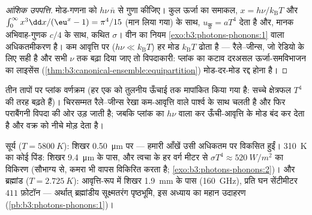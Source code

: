\begin{proof}[आंशिक उपपत्ति]
मोड-गणना को $h\nu\,\bar n$ से गुणा कीजिए। कुल ऊर्जा का
समाकल, $x = h\nu/k_{\text{B}}T$ और $\int_0^\infty
x^3\dd x/(\eu^x - 1) = \pi^4/15$ (मान लिया गया) के साथ, $u_{\text{कु}}
= aT^4$ देता है और, मानक अभिवाह-गुणक $c/4$ के साथ, कथित
$\sigma$। वीन का नियम \cref{exo:b3:photons-phonons:1} वाला
अधिकतमीकरण है। कम आवृत्ति पर ($h\nu \ll
k_{\text{B}}T$) हर मोड $k_{\text{B}}T$ ढोता है ---
रैले--जीन्स, जो रेडियो के लिए सही है और सभी
$\nu$ तक बढ़ा दिया जाए तो विपदाकारी: प्लांक का कटाव दरअसल
ऊर्जा-समविभाजन का लाइसेंस
(\cref{thm:b3:canonical-ensemble:equipartition}) मोड-दर-मोड रद्द
होना है।
\end{proof}

\begin{omfigure}

{\small तीन तापों पर प्लांक वर्णक्रम (हर एक को तुलनीय ऊँचाई तक
मापांकित किया गया है: सच्चे क्षेत्रफल $T^4$ की तरह बढ़ते हैं)।
चिरसम्मत रैले--जीन्स रेखा कम-आवृत्ति वाले पार्श्व के साथ चलती है और
फिर पराबैंगनी विपदा की ओर उड़ जाती है; जबकि प्लांक का $h\nu$ वाला कर
ऊँची-आवृत्ति के मोड बंद कर देता है और वक्र को नीचे मोड़ देता है।}
\end{omfigure}

\begin{example}[तीन तापमापी]\label{ex:b3:photons-phonons:thermometers}
सूर्य ($T = \qty{5800}{K}$): शिखर \qty{0.50}{\micro m} पर ---
हमारी आँखें उसी अधिकतम पर विकसित हुईं। \qty{310}{K} का कोई पिंड:
शिखर \qty{9.4}{\micro m} के पास, और त्वचा के हर वर्ग मीटर से
$\sigma T^4 \approx
\qty{520}{W/m^2}$ का विकिरण (सौभाग्य से, कमरा भी वापस विकिरित करता
है; \cref{exo:b3:photons-phonons:2})। और ब्रह्मांड ($T =
\qty{2.725}{K}$): आवृत्ति-रूप में शिखर \qty{1.9}{mm} के पास
(\qty{160}{GHz}), प्रति घन सेंटीमीटर $411$ फ़ोटॉन ---
अर्थात् ब्रह्मांडीय सूक्ष्मतरंग पृष्ठभूमि, इस अध्याय का महान उदाहरण
(\cref{pb:b3:photons-phonons:1})।
\end{example}

